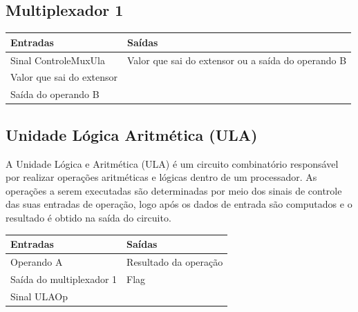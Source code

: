 \documentclass{article}
\begin{document}
 \subsection{Multiplexador 1}
  \FloatBarrier
    \begin{table}[H]
      \begin{center}
        \begin{tabular}[pos]{|m{7cm} | m{7cm}|} 
          \hline
          \cellcolor[gray]{0.9}\textbf{Entradas} & \cellcolor[gray]{0.9}\textbf{Saídas} \\ \hline
            Sinal ControleMuxUla & Valor que sai do extensor ou a saída do operando B\\ \hline
            Valor que sai do extensor & \\ \hline
            Saída do operando B & \\ \hline
        \end{tabular}
      \end{center}
    \end{table}  
    
 \subsection{Unidade Lógica Aritmética (ULA)}
    A Unidade Lógica e Aritmética (ULA) é um circuito combinatório responsável por realizar operações aritméticas e lógicas dentro de um processador. As operações a serem executadas são determinadas por meio dos sinais de controle das suas entradas de operação, logo após os dados de entrada são computados e o resultado é obtido na saída do circuito.
  \FloatBarrier
    \begin{table}[H]
      \begin{center}
        \begin{tabular}[pos]{|m{7cm} | m{7cm}|} 
          \hline
          \cellcolor[gray]{0.9}\textbf{Entradas} & \cellcolor[gray]{0.9}\textbf{Saídas} \\ \hline
            Operando A & Resultado da operação\\ \hline
            Saída do multiplexador 1 & Flag\\ \hline
            Sinal ULAOp & \\ \hline
        \end{tabular}
      \end{center}
    \end{table}  
    
\end{document}
